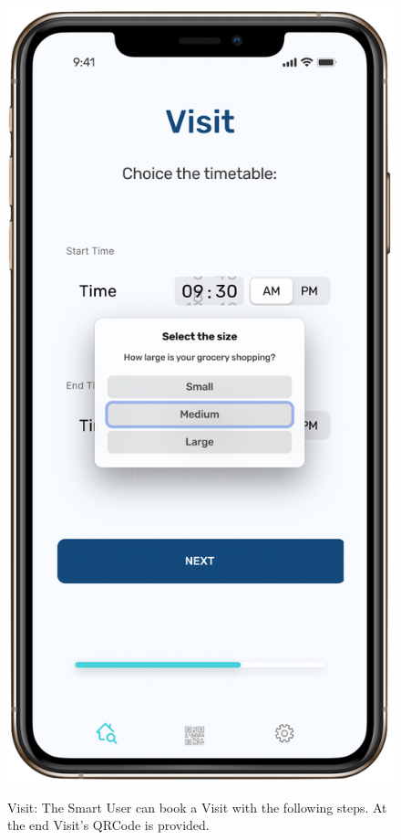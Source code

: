\begin{figure}[H]
\begin{center}
{            \includegraphics[scale=0.30]{images/mockup/visit_size.png}
        }%
%
    \end{center}
    \caption{%
       Visit: The Smart User can book a Visit with the following steps. At the end Visit's QRCode is provided.
     }%
   \label{fig:subfigures}
\end{figure}



